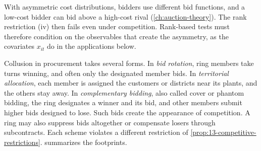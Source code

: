 \begin{remark}\label{rem:13-asym-ranks}
With asymmetric cost distributions, bidders use different bid functions, and a low-cost bidder can bid above a
high-cost rival (\cref{ch:auction-theory}). The rank restriction (iv) then fails even under competition. Rank-based
tests must therefore condition on the observables that create the asymmetry, as the covariates $x_{it}$ do in the
applications below.
\end{remark}

Collusion in procurement takes several forms. In \emph{bid rotation}, ring members take turns winning, and often
only the designated member bids. In \emph{territorial allocation}, each member is assigned the customers or
districts near its plants, and the others stay away. In \emph{complementary bidding}, also called cover or phantom
bidding, the ring designates a winner and its bid, and other members submit higher bids designed to lose. Such bids
create the appearance of competition. A ring may also suppress bids altogether or compensate losers through
subcontracts. Each scheme violates a different restriction of \cref{prop:13-competitive-restrictions}.
 summarizes the footprints.

